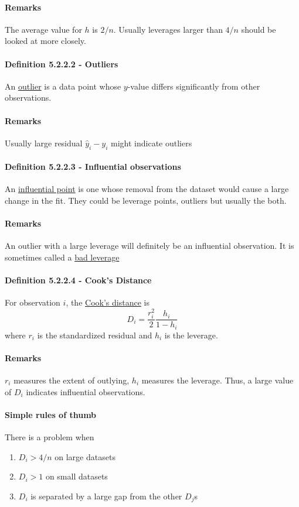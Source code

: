 \documentclass[11pt]{article}
\newcommand{\under}[1]{\underline{#1}}
\begin{document}
\paragraph{Remarks}
The average value for $h$ is $2/n$. Usually leverages larger than $4/n$ should be looked at more closely.
\paragraph{Definition 5.2.2.2 - Outliers}
An \under{outlier} is a data point whose $y$-value differs significantly from other observations.
\paragraph{Remarks}
Usually large residual $\hat{y}_i - y_i$ might indicate outliers
\paragraph{Definition 5.2.2.3 - Influential observations}
An \under{influential point} is one whose removal from the dataset would cause a large change in the fit. They could be leverage points, outliers but usually the both.
\paragraph{Remarks}
An outlier with a large leverage will definitely be an influential observation. It is sometimes called a \under{bad leverage}
\paragraph{Definition 5.2.2.4 - Cook's Distance}
For observation $i$, the \under{Cook's distance} is $$D_i = \frac{r_i^2}{2} \frac{h_i}{1-h_i}$$ where $r_i$ is the standardized residual and $h_i$ is the leverage.
\paragraph{Remarks}
$r_i$ measures the extent of outlying, $h_i$ measures the leverage. Thus, a large value of $D_i$ indicates influential observations.
\paragraph{Simple rules of thumb} There is a problem when
\begin{enumerate}
    \item $D_i > 4/n$ on large datasets
    \item $D_i > 1$ on small datasets
    \item $D_i$ is separated by a large gap from the other $D_j$s
\end{enumerate}
\end{document}
